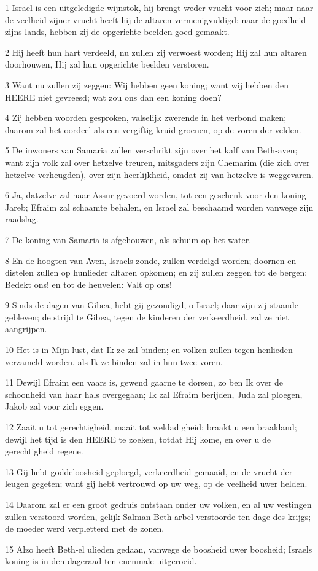 \par 1 Israel is een uitgeledigde wijnstok, hij brengt weder vrucht voor zich; maar naar de veelheid zijner vrucht heeft hij de altaren vermenigvuldigd; naar de goedheid zijns lands, hebben zij de opgerichte beelden goed gemaakt.
\par 2 Hij heeft hun hart verdeeld, nu zullen zij verwoest worden; Hij zal hun altaren doorhouwen, Hij zal hun opgerichte beelden verstoren.
\par 3 Want nu zullen zij zeggen: Wij hebben geen koning; want wij hebben den HEERE niet gevreesd; wat zou ons dan een koning doen?
\par 4 Zij hebben woorden gesproken, valselijk zwerende in het verbond maken; daarom zal het oordeel als een vergiftig kruid groenen, op de voren der velden.
\par 5 De inwoners van Samaria zullen verschrikt zijn over het kalf van Beth-aven; want zijn volk zal over hetzelve treuren, mitsgaders zijn Chemarim (die zich over hetzelve verheugden), over zijn heerlijkheid, omdat zij van hetzelve is weggevaren.
\par 6 Ja, datzelve zal naar Assur gevoerd worden, tot een geschenk voor den koning Jareb; Efraim zal schaamte behalen, en Israel zal beschaamd worden vanwege zijn raadslag.
\par 7 De koning van Samaria is afgehouwen, als schuim op het water.
\par 8 En de hoogten van Aven, Israels zonde, zullen verdelgd worden; doornen en distelen zullen op hunlieder altaren opkomen; en zij zullen zeggen tot de bergen: Bedekt ons! en tot de heuvelen: Valt op ons!
\par 9 Sinds de dagen van Gibea, hebt gij gezondigd, o Israel; daar zijn zij staande gebleven; de strijd te Gibea, tegen de kinderen der verkeerdheid, zal ze niet aangrijpen.
\par 10 Het is in Mijn lust, dat Ik ze zal binden; en volken zullen tegen henlieden verzameld worden, als Ik ze binden zal in hun twee voren.
\par 11 Dewijl Efraim een vaars is, gewend gaarne te dorsen, zo ben Ik over de schoonheid van haar hals overgegaan; Ik zal Efraim berijden, Juda zal ploegen, Jakob zal voor zich eggen.
\par 12 Zaait u tot gerechtigheid, maait tot weldadigheid; braakt u een braakland; dewijl het tijd is den HEERE te zoeken, totdat Hij kome, en over u de gerechtigheid regene.
\par 13 Gij hebt goddeloosheid geploegd, verkeerdheid gemaaid, en de vrucht der leugen gegeten; want gij hebt vertrouwd op uw weg, op de veelheid uwer helden.
\par 14 Daarom zal er een groot gedruis ontstaan onder uw volken, en al uw vestingen zullen verstoord worden, gelijk Salman Beth-arbel verstoorde ten dage des krijgs; de moeder werd verpletterd met de zonen.
\par 15 Alzo heeft Beth-el ulieden gedaan, vanwege de boosheid uwer boosheid; Israels koning is in den dageraad ten enenmale uitgeroeid.

